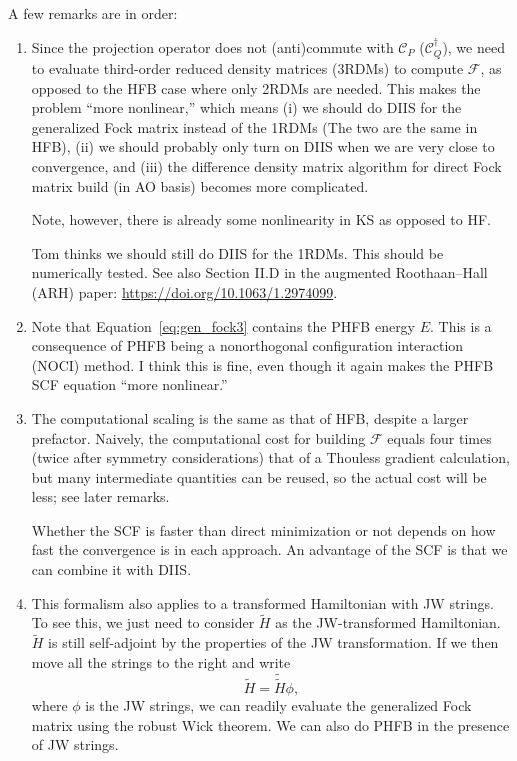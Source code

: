 \documentclass[11pt,letterpaper]{article}
\begin{document}
A few remarks are in order:
\begin{enumerate}
  \item Since the projection operator does not (anti)commute with $\mathscr{C}_P$ ($\mathscr{C}_Q^\dag$),
    we need to evaluate third-order reduced density matrices (3RDMs) to compute $\mathcal{F}$,
    as opposed to the HFB case where only 2RDMs are needed.
    This makes the problem ``more nonlinear,'' which means (i) we should do DIIS for the generalized
    Fock matrix instead of the 1RDMs (The two are the same in HFB),
    (ii) we should probably only turn on DIIS when we are very close to convergence,
    and (iii) the difference density matrix algorithm for direct Fock matrix build (in AO basis)
    becomes more complicated.

    Note, however, there is already some nonlinearity in KS as opposed to HF.

    Tom thinks we should still do DIIS for the 1RDMs. This should be numerically tested.
    See also Section II.D in the augmented Roothaan--Hall (ARH) paper: \url{https://doi.org/10.1063/1.2974099}.
  \item Note that Equation~\eqref{eq:gen_fock3} contains the PHFB energy $E$. This is
    a consequence of PHFB being a nonorthogonal configuration interaction (NOCI) method.
    I think this is fine, even though it again makes the PHFB SCF equation ``more nonlinear.''
  \item The computational scaling is the same as that of HFB, despite a larger prefactor.
    Naively, the computational cost for building $\mathcal{F}$ equals four times
    (twice after symmetry considerations) that of
    a Thouless gradient calculation, but many intermediate quantities can be reused, so
    the actual cost will be less; see later remarks.

    Whether the SCF is faster than direct minimization or not depends on how fast the
    convergence is in each approach. An advantage of the SCF is that we can combine it
    with DIIS.
  \item This formalism also applies to a transformed Hamiltonian with JW strings.
    To see this, we just need to consider $\tilde{H}$ as the JW-transformed Hamiltonian.
    $\tilde{H}$ is still self-adjoint by the properties of the JW transformation.
    If we then move all the strings to the right and write
    \begin{equation}
      \tilde{H} = \tilde{\tilde{H}} \phi,
    \end{equation}
    where $\phi$ is the JW strings, we can readily evaluate the generalized Fock matrix
    using the robust Wick theorem.
    We can also do PHFB in the presence of JW strings.


\end{enumerate}
\end{document}
